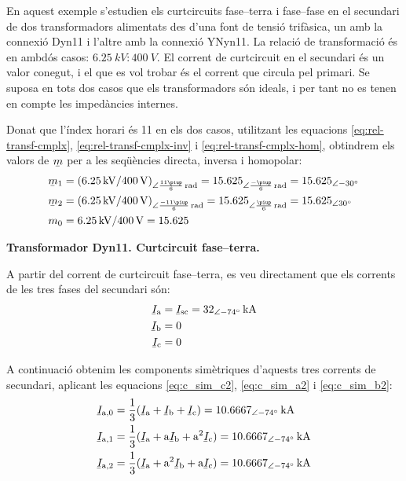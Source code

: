 \begin{exemple}
    En aquest exemple s'estudien els curtcircuits fase--terra i fase--fase en el secundari de dos transformadors alimentats des d'una font de tensió trifàsica, un amb la connexió Dyn11 i l'altre amb la connexió YNyn11. La relació de transformació és en ambdós casos: $\SI{6,25}{kV}\!:\!\SI{400}{V}$. El corrent de curtcircuit en el secundari és un valor conegut, i el que es vol trobar és el corrent que circula pel primari. Se suposa en tots dos casos que els transformadors són ideals, i per tant no es tenen en compte les impedàncies internes.


    Donat que l'índex horari és 11 en els dos casos, utilitzant les equacions \eqref{eq:rel-transf-cmplx}, \eqref{eq:rel-transf-cmplx-inv} i \eqref{eq:rel-transf-cmplx-hom}, obtindrem els valors de $\cmplx{m}$ per a les seqüències directa, inversa i homopolar:
    \begin{align*}
        \cmplx{m}_1 &= (\SI{6,25}{kV} / \SI{400}{V})_{\angle \frac{11 \piup}{6}\si{\,rad}} =
        \num{15,625}_{\angle \frac{-\piup}{6}\si{\,rad}} = \numpd{15,625}{-30} \\
        \cmplx{m}_2 &= (\SI{6,25}{kV} / \SI{400}{V})_{\angle \frac{-11 \piup}{6}\si{\,rad}} =
        \num{15,625}_{\angle \frac{\piup}{6}\si{\,rad}} =\numpd{15,625}{30}  \\
        m_0 &= \SI{6,25}{kV} / \SI{400}{V} = \num{15,625}
    \end{align*}

   \textbf{ Transformador Dyn11. Curtcircuit fase--terra.}

    \begin{center}
       
    \end{center}

    A partir del corrent de curtcircuit fase--terra, es veu directament que els corrents de les tres fases del secundari són:
    \begin{align*}
        \cmplx{I}\ped{a} &= \cmplx{I}\ped{sc} = \SIpd{32}{-74}{kA} \\
        \cmplx{I}\ped{b} &= 0  \\
        \cmplx{I}\ped{c} &= 0
    \end{align*}

    A continuació obtenim les components simètriques d'aquests tres corrents de secundari, aplicant les equacions \eqref{eq:c_sim_c2}, \eqref{eq:c_sim_a2} i \eqref{eq:c_sim_b2}:
    \begin{align*}
        \cmplx{I}\ped{a,0} &= \frac{1}{3} (\cmplx{I}\ped{a} + \cmplx{I}\ped{b} +
        \cmplx{I}\ped{c}) = \SIpd{10,6667}{-74}{kA} \\
        \cmplx{I}\ped{a,1} &= \frac{1}{3} (\cmplx{I}\ped{a} + \au \cmplx{I}\ped{b} +
         \au^2 \cmplx{I}\ped{c}) = \SIpd{10,6667}{-74}{kA}  \\
        \cmplx{I}\ped{a,2} &= \frac{1}{3} (\cmplx{I}\ped{a} + \au^2 \cmplx{I}\ped{b} +
         \au \cmplx{I}\ped{c}) = \SIpd{10,6667}{-74}{kA}
    \end{align*}


\end{exemple}
